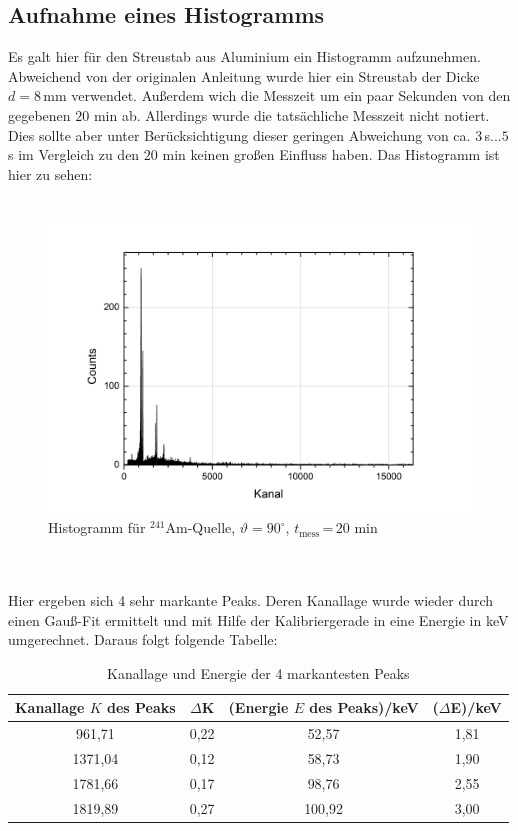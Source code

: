 \documentclass[german,  %
parskip=full,  %
]{scrartcl}
\begin{document}
\subsection{Aufnahme eines Histogramms}
Es galt hier für den Streustab aus Aluminium ein Histogramm aufzunehmen. Abweichend von der originalen Anleitung wurde hier ein Streustab der Dicke $d=8$\,mm verwendet. Außerdem wich die Messzeit um ein paar Sekunden von den gegebenen $20$ min ab. Allerdings wurde die tatsächliche Messzeit nicht notiert. Dies sollte aber unter Berücksichtigung dieser geringen Abweichung von ca. $3$\,s...$5$\,s im Vergleich zu den $20$ min keinen großen Einfluss haben. Das Histogramm ist hier zu sehen:
\\\\
\begin{figure}[h!]\centering
\includegraphics[scale=0.5]{histogramm}
\caption{Histogramm für $^{241}$Am-Quelle, $\vartheta=90^{\circ}$, $t_{\text{mess}}$\,=\,$20$ min}
\end{figure}
\\\\
Hier ergeben sich 4 sehr markante Peaks. Deren Kanallage wurde wieder durch einen Gauß-Fit ermittelt und mit Hilfe der Kalibriergerade in eine Energie in keV umgerechnet. Daraus folgt folgende Tabelle:
\newpage
\begin{table}[h!]\centering
\begin{tabular}{|c|c|c|c|}\hline
Kanallage $K$ des Peaks & $\Delta$K& (Energie $E$ des Peaks)/keV & ($\Delta$E)/keV \\\hline
961,71 & 0,22 & 52,57 & 1,81 \\\hline
1371,04 & 0,12 & 58,73 & 1,90 \\\hline
1781,66 & 0,17 & 98,76 & 2,55 \\\hline
1819,89 & 0,27 & 100,92 & 3,00 \\\hline
\end{tabular}
\caption{Kanallage und Energie der 4 markantesten Peaks}
\end{table}
\end{document}
